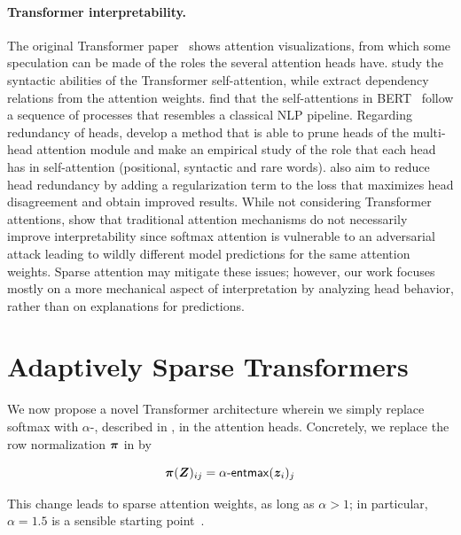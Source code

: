 \paragraph*{Transformer interpretability.} The original Transformer
paper~\citep{vaswani2017attention} shows attention visualizations,
from which some speculation can be made of the roles the several
attention heads have. \citet{marecek-rosa-2018-extracting} study the
syntactic abilities of the Transformer self-attention, while
\citet{raganato2018analysis} extract dependency relations from the
attention weights. \citet{bert-rediscovers} find that the
self-attentions in BERT~\citep{devlin2018bert} follow a sequence of
processes that resembles a classical NLP pipeline. Regarding
redundancy of heads, \citet{specialized} develop a method that is
able to prune heads of the multi-head attention module and make an
empirical study of the role that each head has in self-attention
(positional, syntactic and rare words). \citet{li2018multi} also aim
to reduce head redundancy by adding a regularization term to the loss
that maximizes head disagreement and obtain improved results. While
not considering Transformer attentions, \citet{jain2019attention}
show that traditional attention mechanisms do not necessarily improve
interpretability since softmax attention is vulnerable to an
adversarial attack leading to wildly different model predictions for
the same attention weights. Sparse attention may mitigate these
issues; however, our work focuses mostly on a more mechanical aspect
of interpretation by analyzing head behavior, rather than on
explanations for predictions.

\section{Adaptively Sparse Transformers}
\label{sec:adaptive}

We now propose a novel Transformer architecture wherein we simply replace
softmax with $\alpha$-\entmaxtext{}, described in
, in the attention heads. Concretely, we
replace the row normalization $\bm{\pi}$ in 
by

\begin{equation}
    \bm{\pi}(\bm{Z})_{ij} = \mathop{\mathsf{\alpha}\textnormal{-}\mathsf{entmax}}(\bm{z}_i)_j
\end{equation}

This change leads to sparse attention weights, as long as
$\alpha>1$; in particular, $\alpha=1.5$ is a sensible starting
point~\citep{entmax}.

